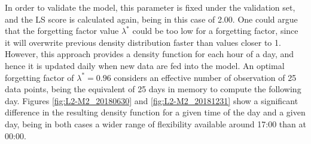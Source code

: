 \begin{table}[htbp]
\centering
\caption{Results of the cross validation procedure for hyperparameter definition for the Hourly Model in the second level of the hierarchy, using LS as a performance score.}
\label{tab:train-test-score-L2M2}
\vspace*{3mm}
\end{table}

In order to validate the model, this parameter is fixed under the validation set, and the LS score is calculated again, being in this case of 2.00. One could argue that the forgetting factor value $\lambda^{*}$ could be too low for a forgetting factor, since it will overwrite previous density distribution faster than values closer to 1. However, this approach provides a density function for each hour of a day, and hence it is updated daily when new data are fed into the model. An optimal forgetting factor of $\lambda^* = 0.96$ considers an effective number of observation of 25 data points, being the equivalent of 25 days in memory to compute the following day. Figures \ref{fig:L2-M2_20180630} and \ref{fig:L2-M2_20181231} show a significant difference in the resulting density function for a given time of the day and a given day, being in both cases a wider range of flexibility available around 17:00 than at 00:00. 




